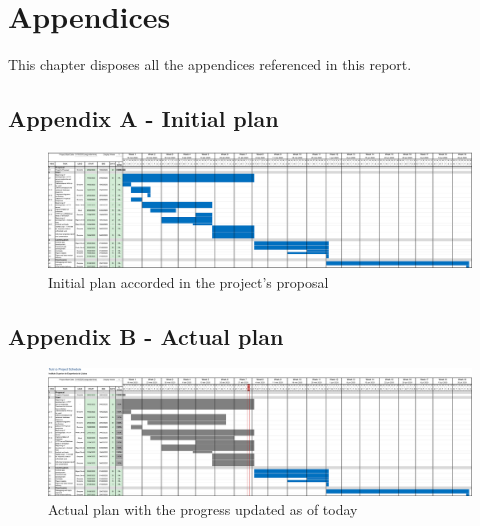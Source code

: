 %
%

\chapter{Appendices}

This chapter disposes all the appendices referenced in this report.

\begin{landscape}
    \appendix    
    \section*{Appendix A - Initial plan}
    \label{app:initial_plan}
    \vspace{20mm}
    \begin{figure}[H]        
        \includegraphics[scale=0.3]{_figures/Project_initial_plan.eps}
        \caption{Initial plan accorded in the project's proposal}
    \end{figure}  
\end{landscape}

\begin{landscape}    
    \appendix
    \section*{Appendix B - Actual plan}
    \label{app:actual_plan}
    \vspace{20mm}
    \begin{figure}[H]        
        \includegraphics[scale=0.3]{_figures/Project_actual_plan.eps}        
        \caption{Actual plan with the progress updated as of today}
    \end{figure}  
\end{landscape}

\appendix


\begin{landscape}
    \appendix
    
\end{landscape}
